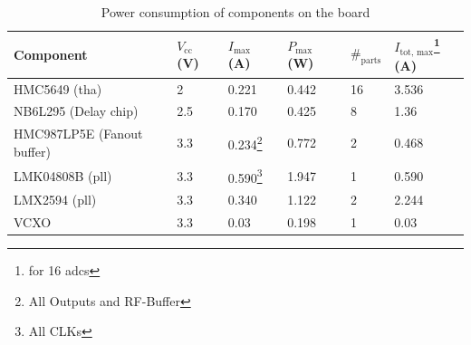 \begin{table}[tbh]
	\caption{Power consumption of components on the board}
	\label{tab:theresacomp}
	\begin{minipage}{\textwidth}
		\centering
		\begin{tabularx}{\textwidth}{Xlllll}
			\toprule
			\textbf{Component}         & $V_\text{cc}$ (V) & $I_\text{max}$ (A)                        & $P_\text{max}$ (W) & $\#_\text{parts}$ & $I_\text{tot, max}$\footnote{for 16 \glspl{adc}} (A) \\ \midrule
			HMC5649 (\gls{tha})        & 2                 & 0.221                                     & 0.442              & 16                & 3.536                                                \\
			NB6L295 (Delay chip)       & 2.5               & 0.170                                     & 0.425              & 8                 & 1.36                                                 \\
			HMC987LP5E (Fanout buffer) & 3.3               & 0.234\footnote{All Outputs and RF-Buffer} & 0.772              & 2                 & 0.468                                                \\
			LMK04808B (\gls{pll})      & 3.3               & 0.590\footnote{All CLKs}                  & 1.947              & 1                 & 0.590                                                \\
			LMX2594 (\gls{pll})        & 3.3               & 0.340                                     & 1.122              & 2                 & 2.244                                                \\
			VCXO                       & 3.3               & 0.03                                      & 0.198              & 1                 & 0.03                                                 \\ \bottomrule
		\end{tabularx}
	\end{minipage}
\end{table}

